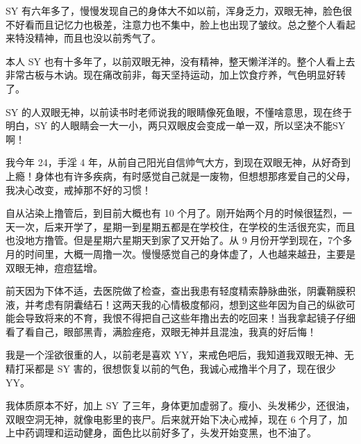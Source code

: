 \begin{case}[眼睛]
    SY 有六年多了，慢慢发现自己的身体大不如以前，浑身乏力，双眼无神，脸色很不好看而且记忆力也极差，注意力也不集中，脸上也出现了皱纹。总之整个人看起来特没精神，而且也没以前秀气了。
\end{case}

\begin{case}[眼睛]
    本人 SY 也有十多年了，以前双眼无神，没有精神，整天懒洋洋的。整个人看上去非常古板与木讷。现在痛改前非，每天坚持运动，加上饮食疗养，气色明显好转了。
\end{case}

\begin{case}[眼睛]
    SY 的人双眼无神，以前读书时老师说我的眼睛像死鱼眼，不懂啥意思，现在终于明白，SY 的人眼睛会一大一小，两只双眼皮会变成一单一双，所以坚决不能SY 啊！
\end{case}

\begin{case}[眼睛]
    我今年 24，手淫 4 年，从前自己阳光自信帅气大方，到现在双眼无神，从好奇到上瘾！身体也有许多疾病，有时感觉自己就是一废物，但想想那疼爱自己的父母，我决心改变，戒掉那不好的习惯！
\end{case}

\begin{case}[眼睛]
    自从沾染上撸管后，到目前大概也有 10 个月了。刚开始两个月的时候很猛烈，一天一次，后来开学了，星期一到星期五都是在学校住，在学校的生活很充实，而且也没地方撸管。但是星期六星期天到家了又开始了。从 9 月份开学到现在，7个多月的时间里，大概一周撸一次。慢慢感觉自己的身体虚了，人也越来越丑，主要是双眼无神，痘痘猛增。
\end{case}

\begin{case}[眼睛]
    前天因为下体不适，去医院做了检查，查出我患有轻度精索静脉曲张，阴囊鞘膜积液，并考虑有阴囊结石！这两天我的心情极度郁闷，想到这些年因为自己的纵欲可能会导致将来的不育，我恨不得把自己这些年撸出去的吃回来！当我拿起镜子仔细看了看自己，眼部黑青，满脸痤疮，双眼无神并且混浊，我真的好后悔！
\end{case}

\begin{case}[眼睛]
    我是一个淫欲很重的人，以前老是喜欢 YY，来戒色吧后，我知道我双眼无神、无精打采都是 SY 害的，很想恢复以前的气色，我诚心戒撸半个月了，现在很少 YY。
\end{case}

\begin{case}[眼睛]
    我体质原本不好，加上 SY 了三年，身体更加虚弱了。瘦小、头发稀少，还很油，双眼空洞无神，就像电影里的丧尸。后来就开始下决心戒掉，现在 6 个月了，加上中药调理和运动健身，面色比以前好多了，头发开始变黑，也不油了。
\end{case}

